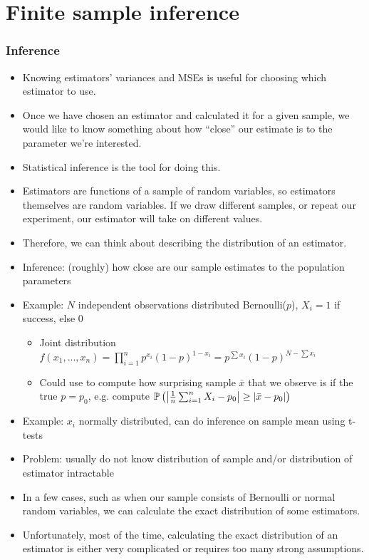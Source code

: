 \section{Finite sample inference}

\begin{frame}\frametitle{Inference}
  \begin{itemize}
  \item Knowing estimators' variances and MSEs is useful for choosing
which estimator to use. 
\item Once we have chosen an estimator and
calculated it for a given sample, we would like to know something
about how ``close'' our estimate is to the parameter we're
interested.
\item  Statistical inference is the tool for doing
this. 
\item Estimators are functions of a sample of random variables, so
estimators themselves are random variables. If we draw different
samples, or repeat our experiment, our estimator will take on
different values. 
\item Therefore, we can think about describing the
distribution of an estimator. 
\framebreak
  \item Inference: (roughly) how close are our sample estimates to the
    population parameters
  \item Example: $N$ independent observations distributed
    Bernoulli($p$), $X_i = 1$ if success, else $0$ 
    \begin{itemize}
    \item Joint distribution $f(x_1, ..., x_n) = \prod_{i=1}^n p^{x_i}
      (1-p)^{1-x_i} = p^{\sum x_i} (1-p)^{N - \sum x_i}$
    \item Could use to compute how surprising sample $\bar{x}$ that we
      observe is if the true $p = p_0$, e.g. compute ${\mathbb{P}}\left(
        \left\vert {\frac{1}{n} \sum_{i=1}^n X_i - p_0 } \right\vert \geq \left\vert {\bar{x} -
          p_0} \right\vert \right)$
    \end{itemize}
  \item Example: $x_i$ normally distributed, can do inference on
    sample mean using t-tests
  \item Problem: usually do not know distribution of sample and/or
    distribution of estimator intractable
  \framebreak
\item In a few cases, such as when our sample consists of Bernoulli or
normal random variables, we can calculate the exact distribution of
some estimators. 
\item Unfortunately, most of the time, calculating the
exact distribution of an estimator is either very complicated or
requires too many strong assumptions. 
\end{itemize}
\end{frame}

